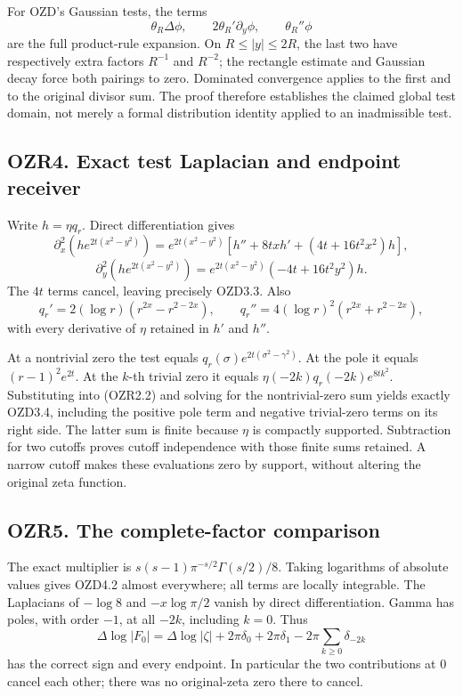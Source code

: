 For OZD's Gaussian tests, the terms \[
\theta_R\Delta\phi,\qquad 2\theta_R'\partial_y\phi,
\qquad \theta_R''\phi
\] are the full product-rule expansion. On \(R\le|y|\le2R\), the last
two have respectively extra factors \(R^{-1}\) and \(R^{-2}\); the
rectangle estimate and Gaussian decay force both pairings to zero.
Dominated convergence applies to the first and to the original divisor
sum. The proof therefore establishes the claimed global test domain, not
merely a formal distribution identity applied to an inadmissible test.

\subsection{OZR4. Exact test Laplacian and endpoint
receiver}\label{ozr4.-exact-test-laplacian-and-endpoint-receiver}

Write \(h=\eta q_r\). Direct differentiation gives \[
\partial_x^2(he^{2t(x^2-y^2)})
=e^{2t(x^2-y^2)}[h''+8txh'+(4t+16t^2x^2)h],
\] \[
\partial_y^2(he^{2t(x^2-y^2)})
=e^{2t(x^2-y^2)}(-4t+16t^2y^2)h.
\] The \(4t\) terms cancel, leaving precisely OZD3.3. Also \[
q_r'=2(\log r)(r^{2x}-r^{2-2x}),\qquad
q_r''=4(\log r)^2(r^{2x}+r^{2-2x}),
\] with every derivative of \(\eta\) retained in \(h'\) and \(h''\).

At a nontrivial zero the test equals
\(q_r(\sigma)e^{2t(\sigma^2-\gamma^2)}\). At the pole it equals
\((r-1)^2e^{2t}\). At the \(k\)-th trivial zero it equals
\(\eta(-2k)q_r(-2k)e^{8tk^2}\). Substituting into (OZR2.2) and solving
for the nontrivial-zero sum yields exactly OZD3.4, including the
positive pole term and negative trivial-zero terms on its right side.
The latter sum is finite because \(\eta\) is compactly supported.
Subtraction for two cutoffs proves cutoff independence with those finite
sums retained. A narrow cutoff makes these evaluations zero by support,
without altering the original zeta function.

\subsection{OZR5. The complete-factor
comparison}\label{ozr5.-the-complete-factor-comparison}

The exact multiplier is \(s(s-1)\pi^{-s/2}\Gamma(s/2)/8\). Taking
logarithms of absolute values gives OZD4.2 almost everywhere; all terms
are locally integrable. The Laplacians of \(-\log8\) and \(-x\log\pi/2\)
vanish by direct differentiation. Gamma has poles, with order \(-1\), at
all \(-2k\), including \(k=0\). Thus \[
\Delta\log|F_0|=\Delta\log|\zeta|
+2\pi\delta_0+2\pi\delta_1
-2\pi\sum_{k\ge0}\delta_{-2k}
\] has the correct sign and every endpoint. In particular the two
contributions at \(0\) cancel each other; there was no original-zeta
zero there to cancel.


